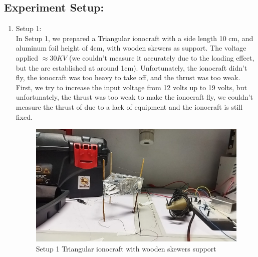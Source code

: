 \subsection*{Experiment Setup:}
\begin{enumerate}
	\item Setup 1:\\
	In Setup 1, we prepared a Triangular ionocraft with a side length
	10 cm, and aluminum foil height of 4cm,
	with wooden skewers as support.
	The voltage applied $\approx 30KV$ (we couldn't measure it
	accurately due to the loading effect, but the arc established at
	around 1cm).
	Unfortunately, the ionocraft didn't fly, the ionocraft was too
	heavy to take off, and the thrust was too weak.
	First, we try to increase the input voltage from 12 volts up
	to 19 volts, but unfortunately, the thrust was too weak to make
	the ionocraft fly, we couldn't measure the thrust of
	due to a lack of equipment and the ionocraft is still fixed.

\begin{figure}[ht]
	\centering
	\includegraphics[scale=0.3]{images/results images/setup1.jpeg}
	\caption{Setup 1 Triangular ionocraft with wooden skewers
	support}
\end{figure}


\end{enumerate}
